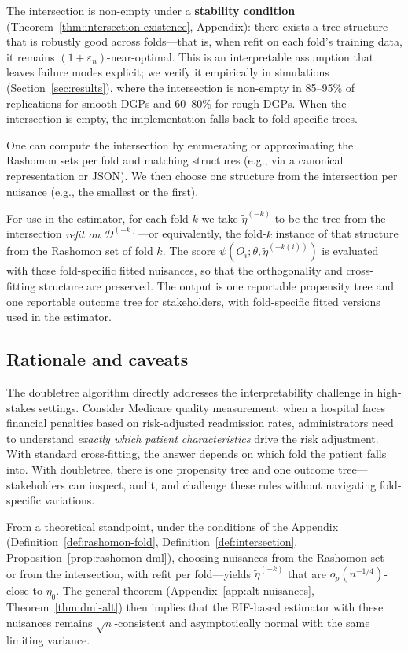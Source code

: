 \documentclass[12pt]{article}
\begin{document}
The intersection is non-empty under a \textbf{stability condition} (Theorem~\ref{thm:intersection-existence}, Appendix): there exists a tree structure that is robustly good across folds---that is, when refit on each fold's training data, it remains $(1+\varepsilon_n)$-near-optimal. This is an interpretable assumption that leaves failure modes explicit; we verify it empirically in simulations (Section~\ref{sec:results}), where the intersection is non-empty in 85--95\% of replications for smooth DGPs and 60--80\% for rough DGPs. When the intersection is empty, the implementation falls back to fold-specific trees.

One can compute the intersection by enumerating or approximating the Rashomon sets per fold and matching structures (e.g., via a canonical representation or JSON). We then choose one structure from the intersection per nuisance (e.g., the smallest or the first).

For use in the estimator, for each fold $k$ we take $\tilde{\eta}^{(-k)}$ to be the tree from the intersection \emph{refit on $\mathcal{D}^{(-k)}$}---or equivalently, the fold-$k$ instance of that structure from the Rashomon set of fold $k$. The score $\psi(O_i; \theta, \tilde{\eta}^{(-k(i))})$ is evaluated with these fold-specific fitted nuisances, so that the orthogonality and cross-fitting structure are preserved. The output is one reportable propensity tree and one reportable outcome tree for stakeholders, with fold-specific fitted versions used in the estimator.

\subsection{Rationale and caveats}

The doubletree algorithm directly addresses the interpretability challenge in high-stakes settings. Consider Medicare quality measurement: when a hospital faces financial penalties based on risk-adjusted readmission rates, administrators need to understand \emph{exactly which patient characteristics} drive the risk adjustment. With standard cross-fitting, the answer depends on which fold the patient falls into. With doubletree, there is one propensity tree and one outcome tree---stakeholders can inspect, audit, and challenge these rules without navigating fold-specific variations.

From a theoretical standpoint, under the conditions of the Appendix (Definition~\ref{def:rashomon-fold}, Definition~\ref{def:intersection}, Proposition~\ref{prop:rashomon-dml}), choosing nuisances from the Rashomon set---or from the intersection, with refit per fold---yields $\tilde{\eta}^{(-k)}$ that are $o_p(n^{-1/4})$-close to $\eta_0$. The general theorem (Appendix~\ref{app:alt-nuisances}, Theorem~\ref{thm:dml-alt}) then implies that the EIF-based estimator with these nuisances remains $\sqrt{n}$-consistent and asymptotically normal with the same limiting variance.
\end{document}
